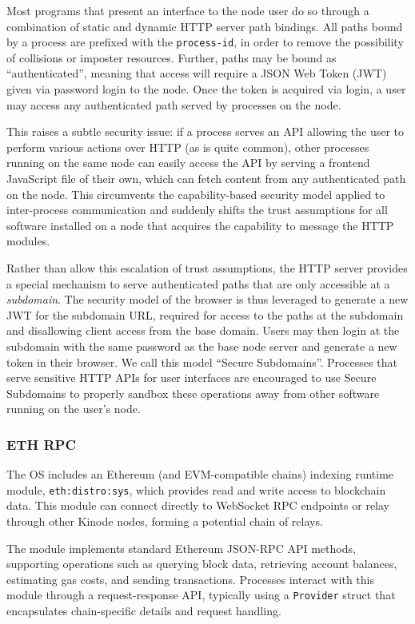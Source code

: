 \documentclass[runningheads]{llncs}
\begin{document}
Most programs that present an interface to the node user do so through a combination of static and dynamic HTTP server path bindings.
All paths bound by a process are prefixed with the \verb|process-id|, in order to remove the possibility of collisions or imposter resources.
Further, paths may be bound as ``authenticated'', meaning that access will require a JSON Web Token (JWT) given via password login to the node.
Once the token is acquired via login, a user may access any authenticated path served by processes on the node.

This raises a subtle security issue: if a process serves an API allowing the user to perform various actions over HTTP (as is quite common), other processes running on the same node can easily access the API by serving a frontend JavaScript file of their own, which can fetch content from any authenticated path on the node.
This circumvents the capability-based security model applied to inter-process communication and suddenly shifts the trust assumptions for all software installed on a node that acquires the capability to message the HTTP modules.

Rather than allow this escalation of trust assumptions, the HTTP server provides a special mechanism to serve authenticated paths that are only accessible at a \textit{subdomain}.
The security model of the browser is thus leveraged to generate a new JWT for the subdomain URL, required for access to the paths at the subdomain and disallowing client access from the base domain.
Users may then login at the subdomain with the same password as the base node server and generate a new token in their browser.
We call this model ``Secure Subdomains''.
Processes that serve sensitive HTTP APIs for user interfaces are encouraged to use Secure Subdomains to properly sandbox these operations away from other software running on the user's node.

\subsubsection{ETH RPC}
\label{sec:oseth}
The OS includes an Ethereum (and EVM-compatible chains) indexing runtime module, \verb|eth:distro:sys|, which provides read and write access to blockchain data. This module can connect directly to WebSocket RPC endpoints or relay through other Kinode nodes, forming a potential chain of relays.

The module implements standard Ethereum JSON-RPC API methods, supporting operations such as querying block data, retrieving account balances, estimating gas costs, and sending transactions. Processes interact with this module through a request-response API, typically using a \verb|Provider| struct that encapsulates chain-specific details and request handling.
\end{document}

